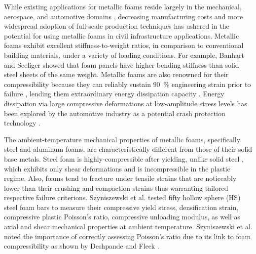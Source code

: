 \documentclass[review]{elsarticle}
\begin{document}
While existing applications for metallic foams reside largely in the mechanical, aerospace, and automotive domains \cite{Smithetal2012}, decreasing manufacturing costs and more widespread adoption of full-scale production techniques has ushered in the potential for using metallic foams in civil infrastructure applications. Metallic foams exhibit excellent stiffness-to-weight ratios, in comparison to conventional building materials, under a variety of loading conditions. For example, Banhart and Seeliger \cite{BanhartSeeliger2008} showed that foam panels have higher bending stiffness than solid steel sheets of the same weight. Metallic foams are also renowned for their compressibility because they can reliably sustain 90~\% engineering strain prior to failure \cite{GibsonAshsby1999}, lending them extraordinary energy dissipation capacity \cite{Ashsby2000}. Energy dissipation via large compressive deformations at low-amplitude stress levels has been explored by the automotive industry as a potential crash protection technology \cite{Lefebvreetal2008}.

The ambient-temperature mechanical properties of metallic foams, specifically steel and aluminum foams, are characteristically different from those of their solid base metals. Steel foam is highly-compressible after yielding, unlike solid steel \cite{DeshpandeFleck2000}, which exhibits only shear deformations and is incompressible in the plastic regime. Also, foams tend to fracture under tensile strains that are noticeably lower than their crushing and compaction strains \cite{Reyesetal2003} thus warranting tailored respective failure criterions. Szyniszewski et al. \cite{Szyniszewskietal2014} tested fifty hollow sphere (HS) steel foam bars to measure their compressive yield stress, densification strain, compressive plastic Poisson's ratio, compressive unloading modulus, as well as axial and shear mechanical properties at ambient temperature. Szyniszewski et al. \cite{Szyniszewskietal2014} noted the importance of correctly assessing Poisson's ratio due to its link to foam compressibility as shown by Deshpande and Fleck \cite{DeshpandeFleck2000}.
\end{document}
